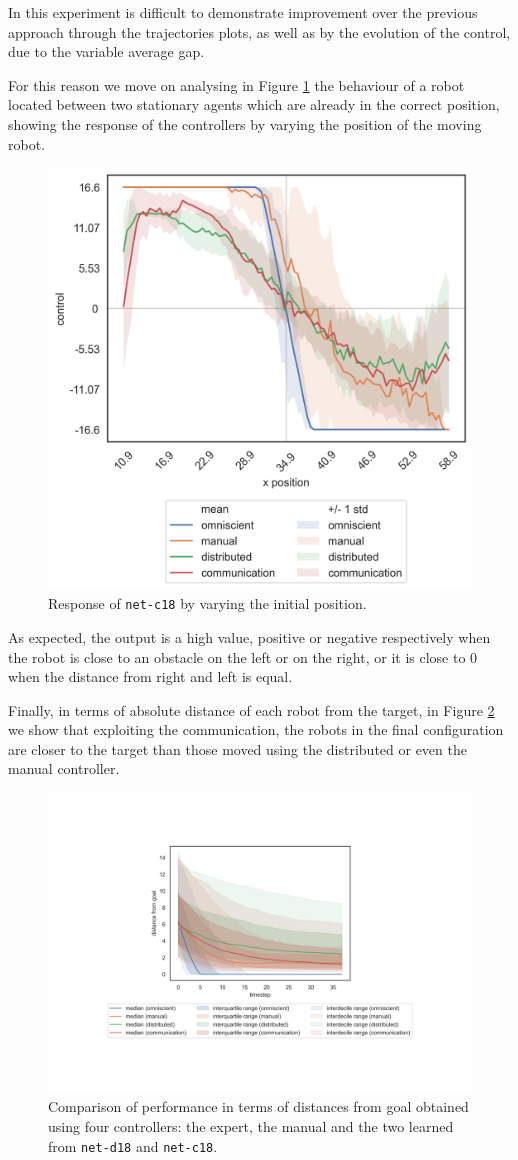In this experiment is difficult to demonstrate improvement over the previous 
approach through the trajectories plots, as well as by the evolution of the control, 
due to the variable average gap. 

For this reason we move on analysing in Figure 
\ref{fig:net-c18responseposition} 
the behaviour of a robot located between two stationary agents which are already 
in the correct position, showing the response of the controllers by varying the 
position of the moving robot. 
\begin{figure}[!htb]
	\centering
	\includegraphics[width=.45\textwidth]{contents/images/net-c18/response-varying_init_position-communication}%
	\caption{Response of \texttt{net-c18} by varying the initial position.}
	\label{fig:net-c18responseposition}
\end{figure}

\noindent
As expected, the output is a high value, positive or 
negative respectively when the robot is close to an obstacle on the left or on 
the 
right, or it is close to $0$ when the distance from right and left is equal.

Finally, in terms of absolute distance of each robot from the target, in Figure 
\ref{fig:net-c18distance} we show that exploiting the communication, the 
robots 
in the final configuration are closer to the target than those moved using the 
distributed or even the manual controller.
\begin{figure}[!htb]
	\centering
	\includegraphics[width=.65\textwidth]{contents/images/net-c18/distances-from-goal-compressed-communication}%
	\caption[Evaluation of \texttt{net-c18} distances from goal.]{Comparison 
	of 
		performance in terms of distances from goal obtained using four controllers: 
		the expert, the manual and the two learned from \texttt{net-d18} and 
		\texttt{net-c18}.}
	\label{fig:net-c18distance}
\end{figure}

